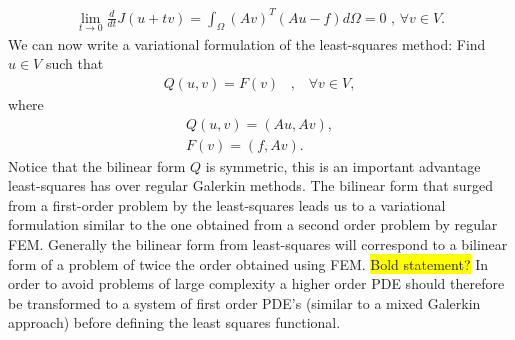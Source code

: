 \begin{align}
	\lim_{t\rightarrow 0} \frac{d}{dt}J(u+tv) = \int_{\Omega}(Av)^T(Au-f)d\Omega = 0 \text{    ,   } \forall v \in V.
	\label{eq:minProb}
\end{align}
We can now write a variational formulation of the least-squares method: Find $u \in V$ such that 
\begin{align}
	Q(u,v) = F(v) \; \; \; , \; \; \; \forall v \in V,
	\label{def:varForm}
\end{align}
where
\begin{align}
	Q(u,v) = (Au,Av), \\
	F(v) = (f,Av).
	\label{def:bilin}
\end{align}
Notice that the bilinear form $Q$ is symmetric, this is an important advantage least-squares has over regular Galerkin methods. The bilinear form that surged from a first-order problem by the least-squares leads us to a variational formulation similar to the one obtained from a second order problem by regular FEM. Generally the bilinear form from least-squares will correspond to a bilinear form of a problem of twice the order obtained using FEM. \colorbox{yellow}{Bold statement?} In order to avoid problems of large complexity a higher order PDE should therefore be transformed to a system of first order PDE's (similar to a mixed Galerkin approach) before defining the least squares functional.
\cite{Jiang}

